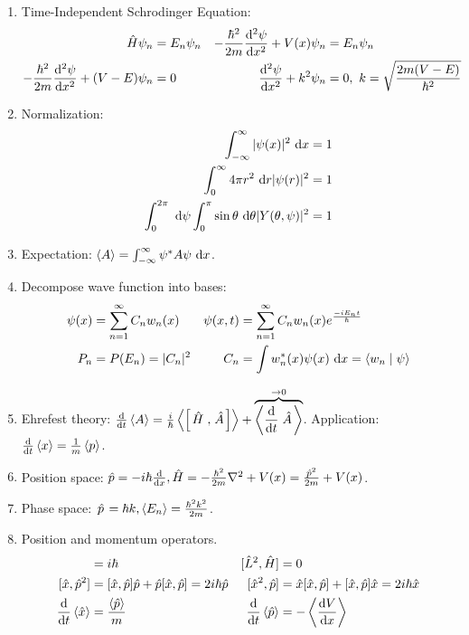 \documentclass{school-22.101-notes}
\begin{document}
\begin{enumerate}
\item Time-Independent Schrodinger Equation:
\begin{align}
\hat{H} \psi_n  &= E_n \psi_n  & 
- \frac{\hbar^2}{2m} \frac{\mathrm{d}^{2}\psi}{\mathrm{d}x^{2}} + V(x) \psi_n  &= E_n \psi_n \\
- \frac{\hbar^2}{2m} \frac{\mathrm{d}^{2}\psi}{\mathrm{d}x^{2}} + (V-E) \psi_n  &= 0  &
\frac{\mathrm{d}^{2}\psi}{\mathrm{d}x^{2}} + k^2 \psi_n  &=0, \mbox{ } k = \sqrt{\frac{2 m (V-E)}{\hbar^2}}
\end{align}

\item Normalization:
\begin{align}
\int_{-\infty}^{\infty} |\psi(x)|^2 \mbox{ }\mathrm{d} x &= 1 \\
\int_0^{\infty} 4 \pi r^2 \mbox{ }\mathrm{d} r |\psi(r)|^2 &= 1 \\
\int_0^{2 \pi} \mbox{ }\mathrm{d} \psi \int_0^{\pi} \sin \theta \mbox{ }\mathrm{d} \theta |Y(\theta, \psi)|^2 &= 1 
\end{align}

\item Expectation: $ \left< A \right> = \int_{-\infty}^{\infty} \psi^* A \psi \mbox{ }\mathrm{d} x $.

\item Decompose wave function into bases: 
\begin{align}
\psi(x) &= \displaystyle\sum_{n=1}^{\infty} C_n w_n (x) & \psi (x,t) &= \displaystyle\sum_{n=1}^{\infty} C_n w_n(x) e^{ \frac{-iE_nt}{\hbar} } \\
P_n &= P(E_n) = |C_n|^2  & C_n &= \int w_n^* (x) \psi(x) \mbox{ }\mathrm{d} x = \langle w_n \mid \psi \rangle
\end{align}

\item Ehrefest theory: $ \frac{\mathrm{d}}{\mathrm{d}t} \left< A \right> = \frac{i}{\hbar} \left< \left[ \left. \hat{H} \right., \left. \hat{A} \right. \right]  \right> + \overbrace{\left< \frac{\mathrm{d}}{\mathrm{d}t} \left. \hat{A} \right. \right>}^{\to 0} $. Application: $\frac{\mathrm{d}}{\mathrm{d}t} \left< x \right> = \frac{1}{m} \left< p \right>$. 

\item Position space: $\hat{p} = -i\hbar \frac{\mathrm{d}}{\mathrm{d}x}, \hat{H} = - \frac{\hbar^2}{2m} \nabla^2 + V(x) = \frac{\hat{p}^2}{2m} + V(x)$. 

\item Phase space: $\left. \hat{p} \right. = \hbar k, \left< E_n \right> = \frac{\hbar^2 k^2}{2m}$. 

\item Position and momentum operators. 
\begin{align}
[\hat{x}, \hat{p} ] &= i \hbar & [\hat{L}^2, \hat{H} ] &= 0 \\
[ \hat{x}, \hat{p}^2] &= [\hat{x}, \hat{p} ] \hat{p} + \hat{p} [\hat{x}, \hat{p} ]  = 2 i \hbar \hat{p} & [\hat{x}^2, \hat{p} ] &= \hat{x} [\hat{x}, \hat{p} ] + [\hat{x}, \hat{p} ] \hat{x} = 2 i \hbar \hat{x} \\
\ddt \expect{\hat{x}} &= \frac{\expect{\hat{p}}}{m} & \ddt \expect{\hat{p}} &= - \expect{ \dVdx }
\end{align}


\end{enumerate}
\end{document}
